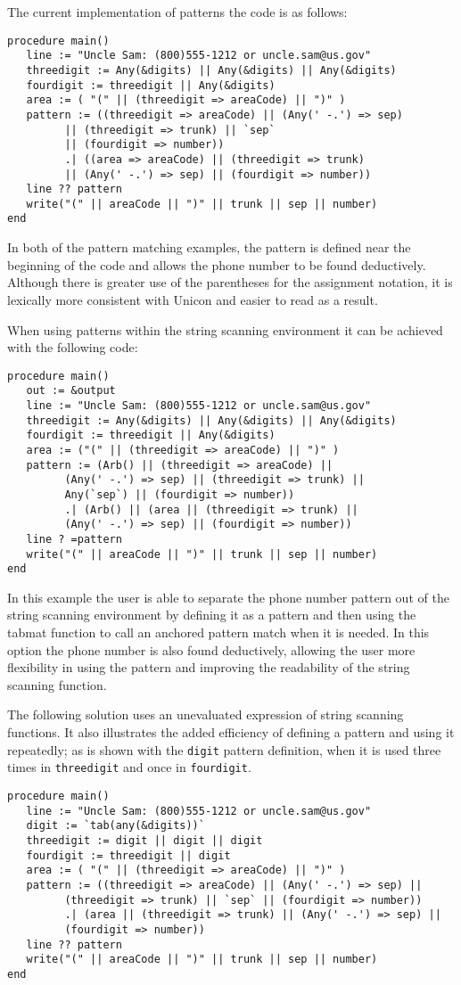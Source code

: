 \documentclass{article}
\begin{document}
The current implementation of patterns the code is as follows:
\begin{verbatim}
procedure main()
   line := "Uncle Sam: (800)555-1212 or uncle.sam@us.gov"
   threedigit := Any(&digits) || Any(&digits) || Any(&digits)
   fourdigit := threedigit || Any(&digits)
   area := ( "(" || (threedigit => areaCode) || ")" )
   pattern := ((threedigit => areaCode) || (Any(' -.') => sep) 
         || (threedigit => trunk) || `sep` 
         || (fourdigit => number))
         .| ((area => areaCode) || (threedigit => trunk) 
         || (Any(' -.') => sep) || (fourdigit => number))
   line ?? pattern
   write("(" || areaCode || ")" || trunk || sep || number) 
end
\end{verbatim}
In both of the pattern matching examples, the pattern is defined near the beginning of the code and allows the phone number to be found deductively. Although there is greater use of the parentheses for the assignment notation, it is lexically more consistent with Unicon and easier to read as a result.  

When using patterns within the string scanning environment it can be achieved with the following code:
\begin{verbatim}
procedure main()
   out := &output
   line := "Uncle Sam: (800)555-1212 or uncle.sam@us.gov"
   threedigit := Any(&digits) || Any(&digits) || Any(&digits)
   fourdigit := threedigit || Any(&digits)
   area := ("(" || (threedigit => areaCode) || ")" )
   pattern := (Arb() || (threedigit => areaCode) || 
         (Any(' -.') => sep) || (threedigit => trunk) || 
         Any(`sep`) || (fourdigit => number)) 
         .| (Arb() || (area || (threedigit => trunk) || 
         (Any(' -.') => sep) || (fourdigit => number))
   line ? =pattern 
   write("(" || areaCode || ")" || trunk || sep || number)
end
\end{verbatim}
In this example the user is able to separate the phone number pattern out of the string scanning environment by defining it as a pattern and then using the tabmat function to call an anchored pattern match when it is needed.  In this option the phone number is also found deductively, allowing the user more flexibility in using the pattern and improving the readability of the string scanning function.

The following solution uses an unevaluated expression of string scanning functions.  It also illustrates the added efficiency of defining a pattern and using it repeatedly; as is shown with the \texttt{digit} pattern definition, when it is used three times in \texttt{threedigit} and once in \texttt{fourdigit}. 
\begin{verbatim}
procedure main()
   line := "Uncle Sam: (800)555-1212 or uncle.sam@us.gov"
   digit := `tab(any(&digits))`
   threedigit := digit || digit || digit
   fourdigit := threedigit || digit
   area := ( "(" || (threedigit => areaCode) || ")" )
   pattern := ((threedigit => areaCode) || (Any(' -.') => sep) ||
         (threedigit => trunk) || `sep` || (fourdigit => number)) 
         .| (area || (threedigit => trunk) || (Any(' -.') => sep) ||
         (fourdigit => number))
   line ?? pattern
   write("(" || areaCode || ")" || trunk || sep || number) 
end
\end{verbatim}
\end{document}

